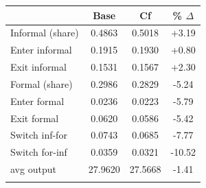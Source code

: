 \begin{table}[htbp]\centering
\begin{tabular}{lccc}
\hline\hline
 & Base & Cf & \% $\Delta$ \\
\hline

Informal (share)      & 0.4863 & 0.5018 & \textcolor{BrickRed}{+3.19} \\
\quad Enter informal      & 0.1915 & 0.1930 & \textcolor{BrickRed}{+0.80} \\
\quad Exit informal       & 0.1531 & 0.1567 & \textcolor{BrickRed}{+2.30} \\
Formal (share)        & 0.2986 & 0.2829 & \textcolor{NavyBlue}{-5.24} \\
\quad Enter formal        & 0.0236 & 0.0223 & \textcolor{NavyBlue}{-5.79} \\
\quad Exit formal         & 0.0620 & 0.0586 & \textcolor{NavyBlue}{-5.42} \\
\midrule
Switch inf-for      & 0.0743 & 0.0685 & -7.77 \\
Switch for-inf      & 0.0359 & 0.0321 & -10.52 \\
\midrule
avg output          & 27.9620 & 27.5668 & -1.41 \\
\addlinespace


\hline\hline
\end{tabular}
\end{table}